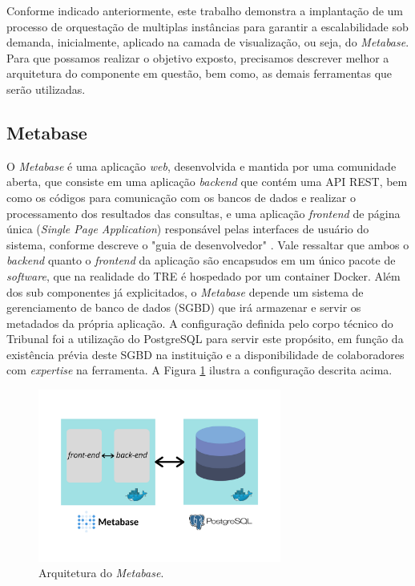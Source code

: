 Conforme indicado anteriormente, este trabalho demonstra a implantação de um processo de orquestação de multiplas instâncias para garantir a escalabilidade sob demanda, inicialmente, aplicado na camada de visualização, ou seja, do \textit{Metabase}. Para que possamos realizar o objetivo exposto, precisamos descrever melhor a arquitetura do componente em questão, bem como, as demais ferramentas que serão utilizadas. 

\subsection{Metabase}

O \textit{Metabase} é uma aplicação \textit{web}, desenvolvida e mantida por uma comunidade aberta, que consiste em uma aplicação \textit{backend} que contém uma API REST, bem como os códigos para comunicação com os bancos de dados e realizar o processamento dos resultados das consultas, e uma aplicação \textit{frontend} de página única (\textit{Single Page Application}) responsável pelas interfaces de usuário do sistema, conforme descreve o "guia de desenvolvedor" \cite{metabaseeevguide}. Vale ressaltar que ambos o \textit{backend} quanto o \textit{frontend} da aplicação são encapsudos em um único pacote de \textit{software}, que na realidade do TRE é hospedado por um container Docker.
Além dos sub componentes já explicitados, o \textit{Metabase} depende um sistema de gerenciamento de banco de dados (SGBD) que irá armazenar e servir os metadados da própria aplicação. A configuração definida pelo corpo técnico do Tribunal foi a utilização do PostgreSQL para servir este propósito, em função da existência prévia deste SGBD na instituição e a disponibilidade de colaboradores com \textit{expertise} na ferramenta. A Figura \ref{fig:arq_metabase} ilustra a configuração descrita acima. 

\begin{figure}[htp]
   \centering
    \includegraphics[width=8cm]{Imagens/Arq_Metabase}
    \caption{Arquitetura do \textit{Metabase}.}
    \label{fig:arq_metabase}
\end{figure} 


